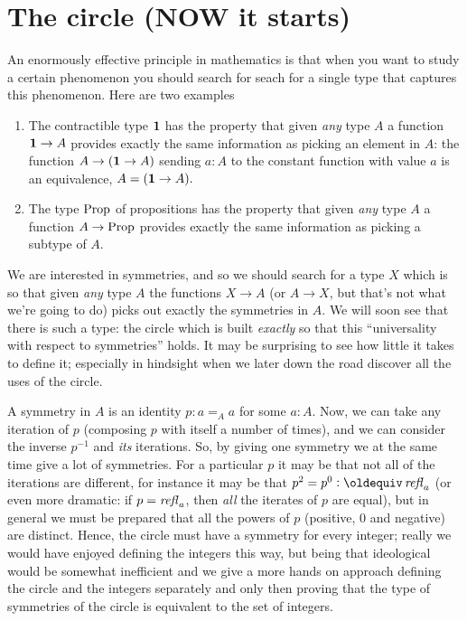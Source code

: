 \section{The circle (NOW it starts)}
\label{sec:sec:circle}
An enormously effective principle in mathematics is that when you want to study a certain phenomenon you should search for seach for a single type that captures this phenomenon.  Here are two examples
\begin{enumerate}
\item The contractible type $\mathbf{1}$ has the property that given \emph{any} type $A$ a function $\mathbf{1}\to A$ provides exactly the same information as picking an element in $A$: the function $A\to (\mathbf{1}\to A)$ sending $a:A$ to the constant function with value $a$ is an equivalence, \ie 
$A=(\mathbf{1}\to A).$
\item The type $\mathrm{Prop}$ of propositions has the property that given \emph{any} type $A$ a function $A\to\mathrm{Prop}$ provides exactly the same information as picking a subtype of $A$.
\end{enumerate}
We are interested in symmetries, and so we should search for a type $X$ which is so that given \emph{any} type $A$ the functions $X\to A$ (or $A\to X$, but that's not what we're going to do) picks out exactly the symmetries in $A$.  We will soon see that there is such a type: the circle which is built \emph{exactly} so that this ``universality with respect to symmetries'' holds.  It may be surprising to see how little it takes to define it; especially in hindsight when we later down the road discover all the uses of the circle.

A symmetry in $A$ is an identity $p:a=_Aa$ for some $a:A$.  Now, we can take any iteration of $p$ (composing $p$ with itself a number of times), and we can consider the inverse $p^{-1}$ and \emph{its} iterations.  So, by giving one symmetry we at the same time give a lot of symmetries.  For a particular $p$ it may be that not all of the iterations are different, for instance it may be that $p^2=p^0\defequi\refl a$ (or even more dramatic: if  $p=\mathop{{\it refl}_{a}}$, then \emph{all} the iterates of $p$ are equal), but in general we must be prepared that all the powers of $p$ (positive, $0$ and negative) are distinct.  Hence, the circle must have a symmetry for every integer; really we would have enjoyed defining the integers this way, but being that ideological would be somewhat inefficient and we give a more hands on approach defining the circle and the integers separately and only then proving that the type of symmetries of the circle is equivalent to the set of integers. 

